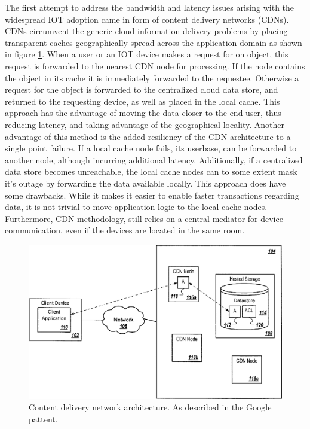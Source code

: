 The first attempt to address the bandwidth and latency issues arising with the widespread IOT adoption came in form of content delivery networks (CDNs).\cite{gagliardi2011content} CDNs circumvent the generic cloud information delivery problems by placing transparent caches geographically spread across the application domain as shown in figure \ref{lit:fig:2}. When a user or an IOT device makes a request for on object, this request is forwarded to the nearest CDN node for processing. If the node contains the object in its cache it is immediately forwarded to the requestee. Otherwise a request for the object is forwarded to the centralized cloud data store, and returned to the requesting device, as well as placed in the local cache. This approach has the advantage of moving the data closer to the end user, thus reducing latency, and taking advantage of the geographical locality. Another advantage of this method is the added resiliency of the CDN architecture to a single point failure. If a local cache node fails, its userbase, can be forwarded to another node, although incurring additional latency. Additionally, if a centralized data store becomes unreachable, the local cache nodes can to some extent mask it's outage by forwarding the data available locally. This approach does have some drawbacks. While it makes it easier to enable faster transactions regarding data, it is not trivial to move application logic to the local cache nodes. Furthermore, CDN methodology, still relies on a central mediator for device communication, even if the devices are located in the same room. 

\begin{figure}[h]
	\centering
	\includegraphics[width=0.6\linewidth]{img/cdn.png}	
	\caption{Content delivery network architecture. As described in the Google pattent.\cite{gagliardi2011content}}
	\label{lit:fig:2}
\end{figure}

